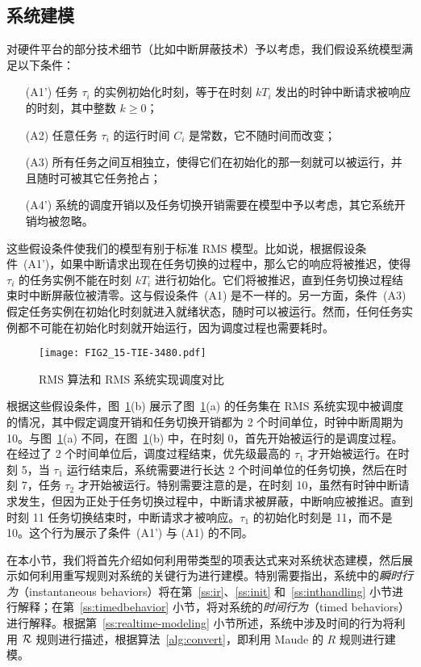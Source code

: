 \subsection{系统建模}
\label{s:formalism}


对硬件平台的部分技术细节（比如中断屏蔽技术）予以考虑，我们假设系统模型满足以下条件：

\begin{enumerate}
\item [(A1')] 任务 $\tau_i$ 的实例初始化时刻，等于在时刻 $kT_i$ 发出的时钟中断请求被响应的时刻，其中整数 $k\ge 0$；
\item [(A2)] 任意任务 $\tau_i$ 的运行时间 $C_i$ 是常数，它不随时间而改变；
\item [(A3)] 所有任务之间互相独立，使得它们在初始化的那一刻就可以被运行，并且随时可被其它任务抢占；
\item [(A4')] 系统的调度开销以及任务切换开销需要在模型中予以考虑，其它系统开销均被忽略。
\end{enumerate}


这些假设条件使我们的模型有别于标准 RMS 模型。比如说，根据假设条件~(A1')，如果中断请求出现在任务切换的过程中，那么它的响应将被推迟，使得 $\tau_i$ 的任务实例不能在时刻 $kT_i$ 进行初始化。它们将被推迟，直到任务切换过程结束时中断屏蔽位被清零。这与假设条件~(A1) 是不一样的。另一方面，条件~(A3) 假定任务实例在初始化时刻就进入就绪状态，随时可以被运行。然而，任何任务实例都不可能在初始化时刻就开始运行，因为调度过程也需要耗时。

\begin{figure}[ht]
\centering
\texttt{[image: FIG2\_15-TIE-3480.pdf]}
\caption{RMS 算法和 RMS 系统实现调度对比}
\label{f:example}
\end{figure}

根据这些假设条件，图~\ref{f:example}(b) 展示了图~\ref{f:example}(a) 的任务集在 RMS 系统实现中被调度的情况，其中假定调度开销和任务切换开销都为 2 个时间单位，时钟中断周期为 10。与图~\ref{f:example}(a) 不同，在图~\ref{f:example}(b) 中，在时刻 0，首先开始被运行的是调度过程。在经过了 2 个时间单位后，调度过程结束，优先级最高的 $\tau_1$ 才开始被运行。在时刻 5，当 $\tau_1$ 运行结束后，系统需要进行长达 2 个时间单位的任务切换，然后在时刻 7，任务 $\tau_2$ 才开始被运行。特别需要注意的是，在时刻 10，虽然有时钟中断请求发生，但因为正处于任务切换过程中，中断请求被屏蔽，中断响应被推迟。直到时刻 11 任务切换结束时，中断请求才被响应。$\tau_1$ 的初始化时刻是 11，而不是 10。这个行为展示了条件~(A1') 与 (A1) 的不同。

在本小节，我们将首先介绍如何利用带类型的项表达式来对系统状态建模，然后展示如何利用重写规则对系统的关键行为进行建模。特别需要指出，系统中的\emph{瞬时行为}（instantaneous  behaviors）将在第~\ref{ss:ir}、\ref{ss:init} 和~\ref{ss:inthandling} 小节进行解释；在第~\ref{ss:timedbehavior} 小节，将对系统的\emph{时间行为}（timed behaviors）进行解释。根据第~\ref{ss:realtime-modeling} 小节所述，系统中涉及时间的行为将利用 $\mathcal{R}$ 规则进行描述，根据算法~\ref{alg:convert}，即利用 Maude 的 $R$ 规则进行建模。

